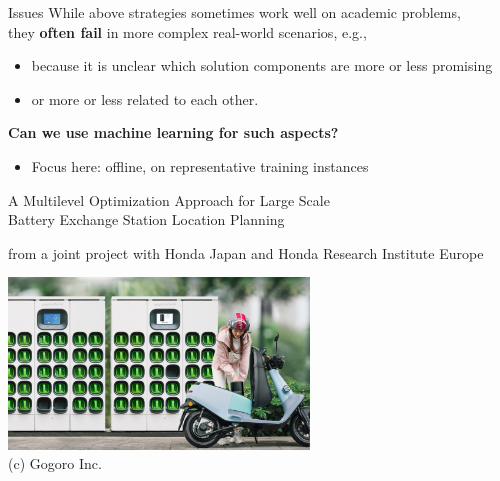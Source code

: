 \documentclass[aspectratio=1610]{beamer}
\newcommand{\important}[1]{{\color{green!60!black}#1}}
\begin{document}
\begin{frame}{Issues}
	While above strategies sometimes work well on academic problems,\\ they \alert{{\bf often fail} in more complex real-world scenarios}, e.g.,
	
	\bigskip
	\begin{itemize}
		\itemsep2ex
		\item because it is \alert{unclear which solution components are more or less promising}
		\item or \alert{more or less related to each other}. 
	\end{itemize}

	\vspace{1cm}
	\important{\bf Can we use machine learning for such aspects?}
	\begin{itemize}
		\item Focus here: offline, on representative training instances
	\end{itemize}
\end{frame}


\begin{frame}{A Multilevel Optimization Approach for
	Large Scale\\ Battery Exchange Station Location Planning}

\citep{jatschka-23}

\medskip
from a joint project with Honda Japan and Honda Research Institute Europe

\bigskip
\begin{center}
	\includegraphics[width=0.6\textwidth]{graphics/Gogoro_Swapping_Station.jpg}\\
	{\small (c) Gogoro Inc.}
\end{center}
\end{frame}
\end{document}
